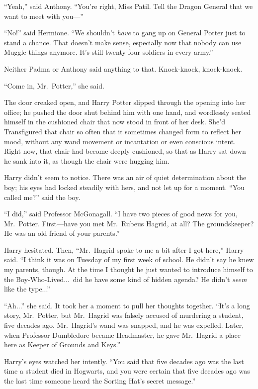 “Yeah,” said Anthony. “You’re right, Miss Patil. Tell the Dragon General that we want to meet with you—”

“No!” said Hermione. “We shouldn’t \emph{have} to gang up on General Potter just to stand a chance. That doesn’t make sense, especially now that nobody can use Muggle things anymore. It’s still twenty-four soldiers in every army.”

Neither Padma or Anthony said anything to that.
\sbreak
Knock-knock, knock-knock.

“Come in, Mr.~Potter,” she said.

The door creaked open, and Harry Potter slipped through the opening into her office; he pushed the door shut behind him with one hand, and wordlessly seated himself in the cushioned chair that now stood in front of her desk. She’d Transfigured that chair so often that it sometimes changed form to reflect her mood, without any wand movement or incantation or even conscious intent. Right now, that chair had become deeply cushioned, so that as Harry sat down he sank into it, as though the chair were hugging him.

Harry didn’t seem to notice. There was an air of quiet determination about the boy; his eyes had locked steadily with hers, and not let up for a moment. “You called me?” said the boy.

“I did,” said Professor McGonagall. “I have two pieces of good news for you, Mr.~Potter. First—have you met Mr.~Rubeus Hagrid, at all? The groundskeeper? He was an old friend of your parents.”

Harry hesitated. Then, “Mr.~Hagrid spoke to me a bit after I got here,” Harry said. “I think it was on Tuesday of my first week of school. He didn’t say he knew my parents, though. At the time I thought he just wanted to introduce himself to the Boy-Who-Lived...\ did he have some kind of hidden agenda? He didn’t \emph{seem} like the type...”

“Ah...” she said. It took her a moment to pull her thoughts together. “It’s a long story, Mr.~Potter, but Mr.~Hagrid was falsely accused of murdering a student, five decades ago. Mr.~Hagrid’s wand was snapped, and he was expelled. Later, when Professor Dumbledore became Headmaster, he gave Mr.~Hagrid a place here as Keeper of Grounds and Keys.”

Harry’s eyes watched her intently. “You said that five decades ago was the last time a student died in Hogwarts, and you were certain that five decades ago was the last time someone heard the Sorting Hat’s secret message.”


